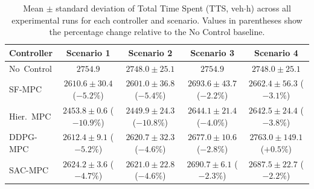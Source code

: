 \begin{table}[htbp]
\centering
\caption{Mean $\pm$ standard deviation of Total Time Spent (TTS, veh$\cdot$h) across all experimental runs for each controller and scenario. Values in parentheses show the percentage change relative to the No Control baseline.}
\label{tab:tts_comparison}
\begin{tabular}{lcccc}
\toprule
Controller & Scenario 1 & Scenario 2 & Scenario 3 & Scenario 4 \\
\midrule
No~Control & $2754.9$ & $2748.0 \pm 25.1$ & $2754.9$ & $2748.0 \pm 25.1$ \\
SF-MPC & $2610.6 \pm 30.4$ ($-5.2\%$) & $2601.0 \pm 36.8$ ($-5.4\%$) & $2693.6 \pm 43.7$ ($-2.2\%$) & $2662.4 \pm 56.3$ ($-3.1\%$) \\
Hier.~MPC & $2453.8 \pm 0.6$ ($-10.9\%$) & $2449.9 \pm 24.3$ ($-10.8\%$) & $2644.1 \pm 21.4$ ($-4.0\%$) & $2642.5 \pm 24.4$ ($-3.8\%$) \\
DDPG-MPC & $2612.4 \pm 9.1$ ($-5.2\%$) & $2620.7 \pm 32.3$ ($-4.6\%$) & $2677.0 \pm 10.6$ ($-2.8\%$) & $2763.0 \pm 149.1$ ($+0.5\%$) \\
SAC-MPC & $2624.2 \pm 3.6$ ($-4.7\%$) & $2621.0 \pm 22.8$ ($-4.6\%$) & $2690.7 \pm 6.1$ ($-2.3\%$) & $2687.5 \pm 22.7$ ($-2.2\%$) \\
\bottomrule
\end{tabular}
\end{table}
